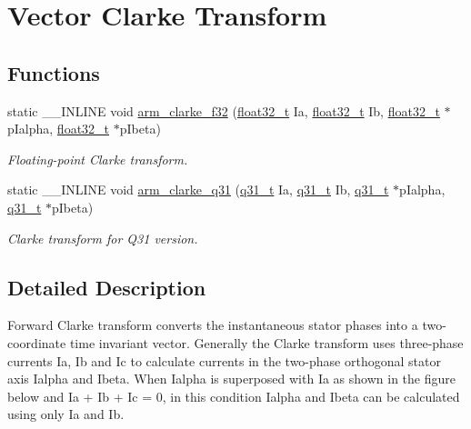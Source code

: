 \hypertarget{group__clarke}{}\section{Vector Clarke Transform}
\label{group__clarke}
\subsection*{Functions}
\begin{DoxyCompactItemize}
\item 
static \+\_\+\+\_\+\+I\+N\+L\+I\+NE void \hyperlink{group__clarke_ga2b4ebec76215e1277c970c269ffdbd76}{arm\+\_\+clarke\+\_\+f32} (\hyperlink{arm__math_8h_a4611b605e45ab401f02cab15c5e38715}{float32\+\_\+t} Ia, \hyperlink{arm__math_8h_a4611b605e45ab401f02cab15c5e38715}{float32\+\_\+t} Ib, \hyperlink{arm__math_8h_a4611b605e45ab401f02cab15c5e38715}{float32\+\_\+t} $\ast$p\+Ialpha, \hyperlink{arm__math_8h_a4611b605e45ab401f02cab15c5e38715}{float32\+\_\+t} $\ast$p\+Ibeta)
\begin{DoxyCompactList}\small\item\em Floating-\/point Clarke transform. \end{DoxyCompactList}\item 
static \+\_\+\+\_\+\+I\+N\+L\+I\+NE void \hyperlink{group__clarke_ga7fd106ca8d346a2a472842e0656014c1}{arm\+\_\+clarke\+\_\+q31} (\hyperlink{arm__math_8h_adc89a3547f5324b7b3b95adec3806bc0}{q31\+\_\+t} Ia, \hyperlink{arm__math_8h_adc89a3547f5324b7b3b95adec3806bc0}{q31\+\_\+t} Ib, \hyperlink{arm__math_8h_adc89a3547f5324b7b3b95adec3806bc0}{q31\+\_\+t} $\ast$p\+Ialpha, \hyperlink{arm__math_8h_adc89a3547f5324b7b3b95adec3806bc0}{q31\+\_\+t} $\ast$p\+Ibeta)
\begin{DoxyCompactList}\small\item\em Clarke transform for Q31 version. \end{DoxyCompactList}\end{DoxyCompactItemize}


\subsection{Detailed Description}
Forward Clarke transform converts the instantaneous stator phases into a two-\/coordinate time invariant vector. Generally the Clarke transform uses three-\/phase currents {\ttfamily Ia, Ib and Ic} to calculate currents in the two-\/phase orthogonal stator axis {\ttfamily Ialpha} and {\ttfamily Ibeta}. When {\ttfamily Ialpha} is superposed with {\ttfamily Ia} as shown in the figure below  and {\ttfamily Ia + Ib + Ic = 0}, in this condition {\ttfamily Ialpha} and {\ttfamily Ibeta} can be calculated using only {\ttfamily Ia} and {\ttfamily Ib}.

